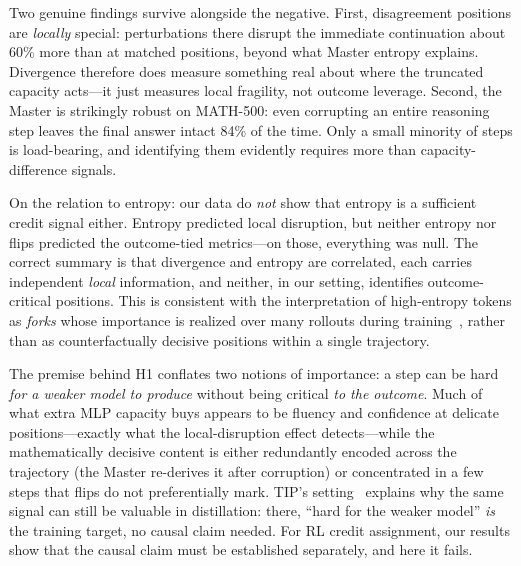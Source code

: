 \documentclass[times, 10pt,twocolumn]{article}
\begin{document}
Two genuine findings survive alongside the negative. First, disagreement
positions are \emph{locally} special: perturbations there disrupt the
immediate continuation about 60\% more than at matched positions, beyond what
Master entropy explains. Divergence therefore does measure something real
about where the truncated capacity acts---it just measures local fragility,
not outcome leverage. Second, the Master is strikingly robust on MATH-500:
even corrupting an entire reasoning step leaves the final answer intact
84\% of the time. Only a small minority of steps is load-bearing, and
identifying them evidently requires more than capacity-difference signals.

On the relation to entropy: our data do \emph{not} show that entropy is a
sufficient credit signal either. Entropy predicted local disruption, but
neither entropy nor flips predicted the outcome-tied metrics---on those,
everything was null. The correct summary is that divergence and entropy are
correlated, each carries independent \emph{local} information, and neither, in
our setting, identifies outcome-critical positions. This is consistent with
the interpretation of high-entropy tokens as \emph{forks} whose importance is
realized over many rollouts during training~\cite{wang2025forking}, rather
than as counterfactually decisive positions within a single trajectory.


The premise behind H1 conflates two notions of importance: a step can be hard
\emph{for a weaker model to produce} without being critical \emph{to the
outcome}. Much of what extra MLP capacity buys appears to be fluency and
confidence at delicate positions---exactly what the local-disruption effect
detects---while the mathematically decisive content is either redundantly
encoded across the trajectory (the Master re-derives it after corruption) or
concentrated in a few steps that flips do not preferentially mark. TIP's
setting~\cite{xu2026tip} explains why the same signal can still be valuable in
distillation: there, ``hard for the weaker model'' \emph{is} the training
target, no causal claim needed. For RL credit assignment, our results show
that the causal claim must be established separately, and here it fails.

\end{document}

